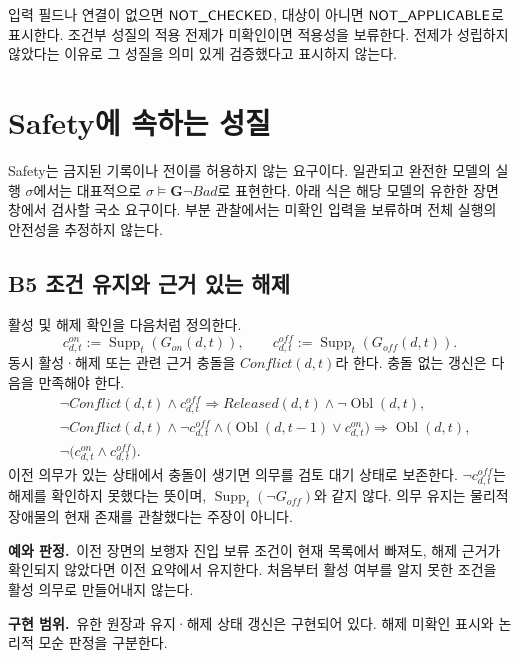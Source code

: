 \documentclass[11pt,a4paper]{article}
\newcommand{\status}[1]{\textnormal{\textsf{#1}}}
\newcommand{\G}{\mathbf{G}}
\newcommand{\supp}{\operatorname{Supp}}
\newcommand{\obl}{\operatorname{Obl}}
\newcommand{\example}{\par\textbf{예와 판정.}\ }
\newcommand{\impl}{\par\textbf{구현 범위.}\ }
\begin{document}
입력 필드나 연결이 없으면 $\status{NOT\_CHECKED}$,
대상이 아니면 $\status{NOT\_APPLICABLE}$로 표시한다.
조건부 성질의 적용 전제가 미확인이면 적용성을 보류한다.
전제가 성립하지 않았다는 이유로 그 성질을 의미 있게 검증했다고 표시하지 않는다.

\clearpage
\section{Safety에 속하는 성질}
Safety는 금지된 기록이나 전이를 허용하지 않는 요구이다.
일관되고 완전한 모델의 실행 $\sigma$에서는 대표적으로
$\sigma\models\G\neg Bad$로 표현한다.
아래 식은 해당 모델의 유한한 장면 창에서 검사할 국소 요구이다.
부분 관찰에서는 미확인 입력을 보류하며 전체 실행의 안전성을 추정하지 않는다.

\subsection{B5 조건 유지와 근거 있는 해제}\label{prop:b5}
활성 및 해제 확인을 다음처럼 정의한다.
\begin{equation}
 c^{on}_{d,t}:=\supp_t(G_{on}(d,t)),\qquad
 c^{off}_{d,t}:=\supp_t(G_{off}(d,t)).
\end{equation}
동시 활성·해제 또는 관련 근거 충돌을 $Conflict(d,t)$라 한다.
충돌 없는 갱신은 다음을 만족해야 한다.
\begin{align}
 &\neg Conflict(d,t)\land c^{off}_{d,t}
   \Rightarrow Released(d,t)\land\neg\obl(d,t),\label{eq:b5release}\\
 &\neg Conflict(d,t)\land\neg c^{off}_{d,t}
   \land\bigl(\obl(d,t-1)\lor c^{on}_{d,t}\bigr)
   \Rightarrow\obl(d,t),\label{eq:b5carry}\\
 &\neg\bigl(c^{on}_{d,t}\land c^{off}_{d,t}\bigr).
\end{align}
이전 의무가 있는 상태에서 충돌이 생기면 의무를 검토 대기 상태로 보존한다.
$\neg c^{off}_{d,t}$는 해제를 확인하지 못했다는 뜻이며,
$\supp_t(\neg G_{off})$와 같지 않다.
의무 유지는 물리적 장애물의 현재 존재를 관찰했다는 주장이 아니다.

\example 이전 장면의 보행자 진입 보류 조건이 현재 목록에서 빠져도,
해제 근거가 확인되지 않았다면 이전 요약에서 유지한다.
처음부터 활성 여부를 알지 못한 조건을 활성 의무로 만들어내지 않는다.
\impl 유한 원장과 유지·해제 상태 갱신은 구현되어 있다.
해제 미확인 표시와 논리적 모순 판정을 구분한다.
\end{document}

